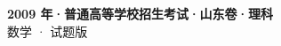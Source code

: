 \documentclass[zihao=-4, a4paper]{ctexart}
\begin{document}
\begin{center}
  {\Large\bfseries 2009 年·普通高等学校招生考试·山东卷·理科}\\[4pt]
  {\large 数学 · 试题版}
\end{center}
\medskip
{}

\end{document}
